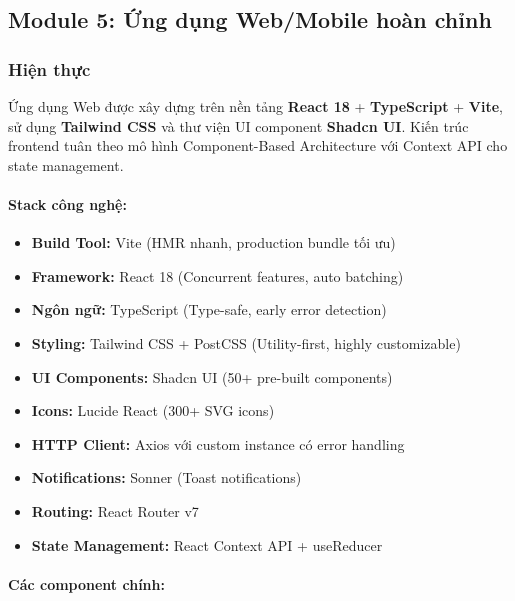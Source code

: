 \subsection{Module 5: Ứng dụng Web/Mobile hoàn chỉnh}

\subsubsection{Hiện thực}

Ứng dụng Web được xây dựng trên nền tảng \textbf{React 18} + \textbf{TypeScript} + \textbf{Vite}, sử dụng \textbf{Tailwind CSS} và thư viện UI component \textbf{Shadcn UI}. Kiến trúc frontend tuân theo mô hình Component-Based Architecture với Context API cho state management.

\paragraph{Stack công nghệ:}

\begin{itemize}
    \item \textbf{Build Tool:} Vite (HMR nhanh, production bundle tối ưu)
    \item \textbf{Framework:} React 18 (Concurrent features, auto batching)
    \item \textbf{Ngôn ngữ:} TypeScript (Type-safe, early error detection)
    \item \textbf{Styling:} Tailwind CSS + PostCSS (Utility-first, highly customizable)
    \item \textbf{UI Components:} Shadcn UI (50+ pre-built components)
    \item \textbf{Icons:} Lucide React (300+ SVG icons)
    \item \textbf{HTTP Client:} Axios với custom instance có error handling
    \item \textbf{Notifications:} Sonner (Toast notifications)
    \item \textbf{Routing:} React Router v7
    \item \textbf{State Management:} React Context API + useReducer
\end{itemize}

\paragraph{Các component chính:}

